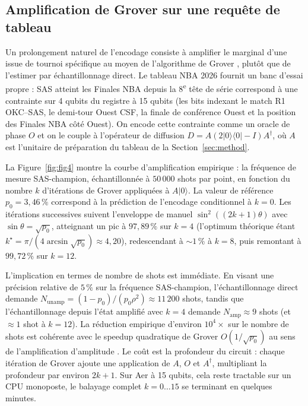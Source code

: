 \documentclass[11pt]{article}
\begin{document}
\subsection{Amplification de Grover sur une requête de tableau}
\label{sec:grover}

Un prolongement naturel de l'encodage consiste à amplifier le marginal
d'une issue de tournoi spécifique au moyen de l'algorithme de Grover
\cite{grover1996fast}, plutôt que de l'estimer par échantillonnage
direct. Le tableau NBA 2026 fournit un banc d'essai propre : SAS
atteint les Finales NBA depuis la 8\textsuperscript{e} tête de série
correspond à une contrainte sur 4 qubits du registre à 15 qubits (les
bits indexant le match R1 OKC--SAS, le demi-tour Ouest CSF, la finale
de conférence Ouest et la position des Finales NBA côté Ouest). On
encode cette contrainte comme un oracle de phase $O$ et on le couple à
l'opérateur de diffusion $D = A (2|0\rangle\langle 0| - I) A^\dagger$,
où $A$ est l'unitaire de préparation du tableau de la
Section~\ref{sec:method}.

La Figure~\ref{fig:fig4} montre la courbe d'amplification empirique :
la fréquence de mesure SAS-champion, échantillonnée à $50\,000$ shots
par point, en fonction du nombre $k$ d'itérations de Grover appliquées
à $A|0\rangle$. La valeur de référence $p_0 = 3{,}46\,\%$ correspond à
la prédiction de l'encodage conditionnel à $k=0$. Les itérations
successives suivent l'enveloppe de manuel
$\sin^2((2k+1)\theta)$ avec $\sin\theta = \sqrt{p_0}$, atteignant un
pic à $97{,}89\,\%$ sur $k = 4$ (l'optimum théorique étant
$k^\star = \pi / (4 \arcsin\sqrt{p_0}) \approx 4{,}20$), redescendant à
$\sim 1\,\%$ à $k = 8$, puis remontant à $99{,}72\,\%$ sur $k = 12$.

L'implication en termes de nombre de shots est immédiate. En visant
une précision relative de $5\,\%$ sur la fréquence SAS-champion,
l'échantillonnage direct demande
$N_{\text{unamp}} = (1 - p_0)/(p_0 \rho^2) \approx 11\,200$ shots,
tandis que l'échantillonnage depuis l'état amplifié avec $k = 4$
demande $N_{\text{amp}} \approx 9$ shots (et $\approx 1$ shot à
$k = 12$). La réduction empirique d'environ $10^4 \times$ sur le
nombre de shots est cohérente avec le speedup quadratique de Grover
$O(1/\sqrt{p_0})$ au sens de l'amplification d'amplitude
\cite{brassard2002quantum}. Le coût est la profondeur du circuit :
chaque itération de Grover ajoute une application de $A$, $O$ et
$A^\dagger$, multipliant la profondeur par environ $2k + 1$. Sur Aer à
15 qubits, cela reste tractable sur un CPU monoposte, le balayage
complet $k = 0\dots15$ se terminant en quelques minutes.
\end{document}
